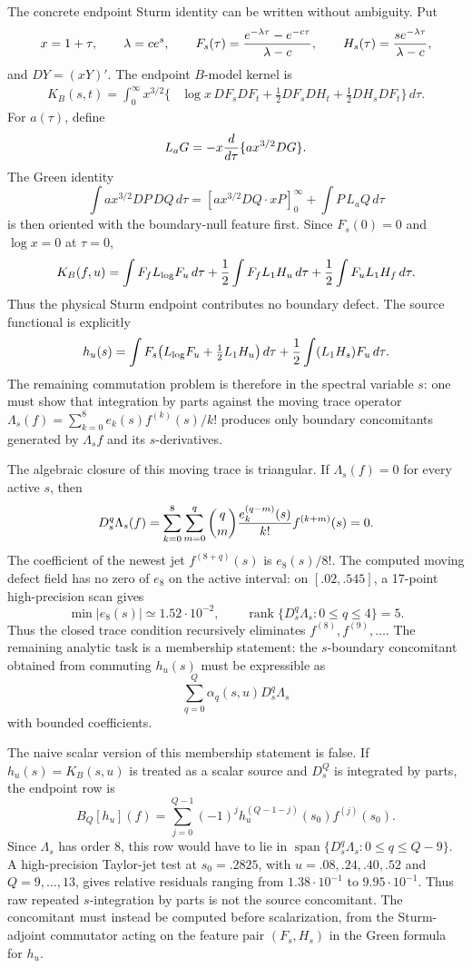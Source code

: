 \documentclass[11pt]{article}
\begin{document}
The concrete endpoint Sturm identity can be written without ambiguity.  Put
\[
  x=1+\tau,\qquad \lambda=ce^s,\qquad
  F_s(\tau)={e^{-\lambda\tau}-e^{-c\tau}\over \lambda-c},
  \qquad
  H_s(\tau)={s e^{-\lambda\tau}\over \lambda-c},
\]
and \(D Y=(xY)'\).  The endpoint \(B\)-model kernel is
\[
\begin{aligned}
K_B(s,t)=\int_0^\infty x^{3/2}\{&
\log x\,D F_sD F_t
+\frac12 D F_sD H_t
+\frac12 D H_sD F_t\}\,d\tau .
\end{aligned}
\]
For \(a(\tau)\), define
\[
  L_aG=-x{d\over d\tau}\{a x^{3/2}DG\}.
\]
The Green identity
\[
  \int a x^{3/2}DP\,DQ\,d\tau
  =
  [a x^{3/2}DQ\cdot xP]_0^\infty
  +\int P\,L_aQ\,d\tau
\]
is then oriented with the boundary-null feature first.  Since \(F_s(0)=0\) and
\(\log x=0\) at \(\tau=0\),
\[
  K_B(f,u)
  =
  \int F_f L_{\log}F_u\,d\tau
  +{1\over2}\int F_f L_1H_u\,d\tau
  +{1\over2}\int F_u L_1H_f\,d\tau .
\]
Thus the physical Sturm endpoint contributes no boundary defect.  The source
functional is explicitly
\[
  h_u(s)=
  \int F_s\bigl(L_{\log}F_u+\tfrac12L_1H_u\bigr)\,d\tau
  +{1\over2}\int (L_1H_s)F_u\,d\tau .
\]
The remaining commutation problem is therefore in the spectral variable \(s\):
one must show that integration by parts against the moving trace operator
\(\Lambda_s(f)=\sum_{k=0}^8 e_k(s)f^{(k)}(s)/k!\) produces only boundary
concomitants generated by \(\Lambda_s f\) and its \(s\)-derivatives.

The algebraic closure of this moving trace is triangular.  If
\(\Lambda_s(f)=0\) for every active \(s\), then
\[
  D_s^q\Lambda_s(f)=
  \sum_{k=0}^8\sum_{m=0}^q {q\choose m}
  {e_k^{(q-m)}(s)\over k!}f^{(k+m)}(s)=0 .
\]
The coefficient of the newest jet \(f^{(8+q)}(s)\) is \(e_8(s)/8!\).  The
computed moving defect field has no zero of \(e_8\) on the active interval:
on \([.02,.545]\), a 17-point high-precision scan gives
\[
  \min |e_8(s)|\simeq 1.52\cdot10^{-2},
  \qquad
  \operatorname{rank}\{D_s^q\Lambda_s:0\le q\le4\}=5.
\]
Thus the closed trace condition recursively eliminates
\(f^{(8)},f^{(9)},\ldots\).  The remaining analytic task is a membership
statement: the \(s\)-boundary concomitant obtained from commuting \(h_u(s)\)
must be expressible as
\[
  \sum_{q=0}^Q \alpha_q(s,u)D_s^q\Lambda_s
\]
with bounded coefficients.

The naive scalar version of this membership statement is false.  If
\(h_u(s)=K_B(s,u)\) is treated as a scalar source and \(D_s^Q\) is integrated by
parts, the endpoint row is
\[
  B_Q[h_u](f)=\sum_{j=0}^{Q-1}(-1)^j h_u^{(Q-1-j)}(s_0)f^{(j)}(s_0).
\]
Since \(\Lambda_s\) has order \(8\), this row would have to lie in
\(\operatorname{span}\{D_s^q\Lambda_s:0\le q\le Q-9\}\).  A high-precision
Taylor-jet test at \(s_0=.2825\), with \(u=.08,.24,.40,.52\) and
\(Q=9,\ldots,13\), gives relative residuals ranging from \(1.38\cdot10^{-1}\)
to \(9.95\cdot10^{-1}\).  Thus raw repeated \(s\)-integration by parts is not
the source concomitant.  The concomitant must instead be computed before
scalarization, from the Sturm-adjoint commutator acting on the feature pair
\((F_s,H_s)\) in the Green formula for \(h_u\).
\end{document}
